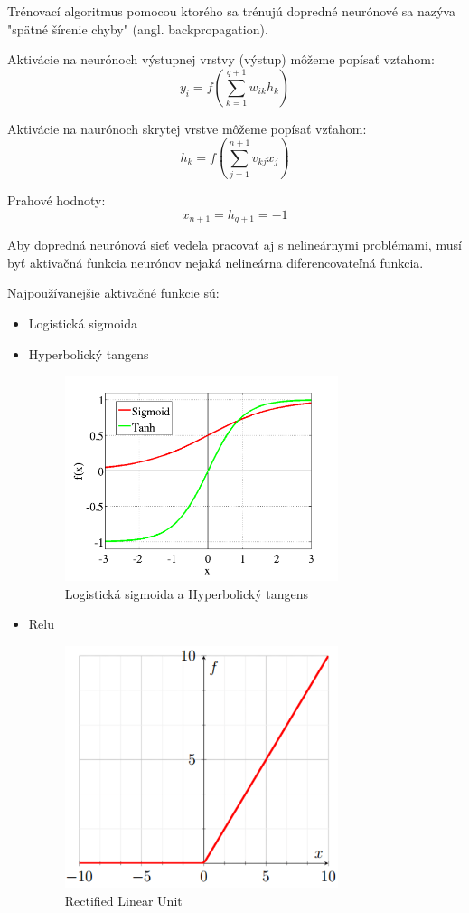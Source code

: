 Trénovací algoritmus pomocou ktorého sa trénujú dopredné neurónové sa nazýva "spätné šírenie chyby" (angl. backpropagation).

Aktivácie na neurónoch výstupnej vrstvy (výstup) môžeme popísať vzťahom:
\begin{equation}
y_i = f(\sum_{k=1}^{q+1}w_{ik}h_{k})
\end{equation}

Aktivácie na naurónoch skrytej vrstve môžeme popísať vzťahom:
\begin{equation}
	h_{k} = f(\sum_{j=1}^{n+1}v_{kj}x_{j})
\end{equation}

Prahové hodnoty:
\begin{equation}
	x_{n+1} = h_{q+1} = -1
\end{equation}

Aby dopredná neurónová sieť vedela pracovať aj s nelineárnymi problémami, musí byť aktivačná funkcia neurónov
nejaká nelineárna diferencovateľná funkcia. 

Najpoužívanejšie aktivačné funkcie sú:

\begin{itemize}
	\item Logistická sigmoida
	\item Hyperbolický tangens
	
	\begin{figure}[H]
		\centering
		\includegraphics[width=8cm]{assets/activation_functions}
		\caption{Logistická sigmoida a Hyperbolický tangens}
	\end{figure}
	\item Relu
	\begin{figure}[H]
		\centering
		\includegraphics[width=8cm]{assets/relu}
		\caption{Rectified Linear Unit}
	\end{figure}
\end{itemize}

